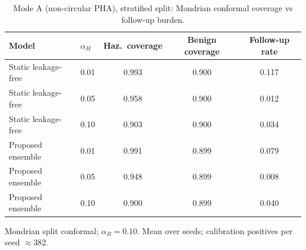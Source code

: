 \begin{table}[t]
\centering
\small
\caption{Mode A (non-circular PHA), stratified split: Mondrian conformal coverage vs follow-up burden.}
\label{tab:conf_pha_stratified}
\begin{tabular}{llccc}
\toprule
Model & $\alpha_H$ & Haz.\ coverage & Benign coverage & Follow-up rate \\
\midrule
Static leakage-free & 0.01 & 0.993 & 0.900 & 0.117 \\
Static leakage-free & 0.05 & 0.958 & 0.900 & 0.012 \\
Static leakage-free & 0.10 & 0.903 & 0.900 & 0.034 \\
\midrule
Proposed ensemble & 0.01 & 0.991 & 0.899 & 0.079 \\
Proposed ensemble & 0.05 & 0.948 & 0.899 & 0.008 \\
Proposed ensemble & 0.10 & 0.900 & 0.899 & 0.040 \\
\bottomrule
\end{tabular}
\par\vspace{2pt}\footnotesize Mondrian split conformal; $\alpha_B=0.10$. Mean over seeds; calibration positives per seed $\approx 382$.
\end{table}
